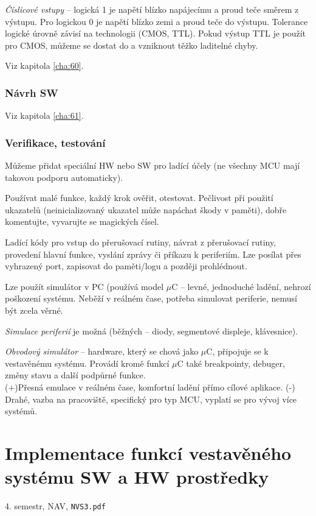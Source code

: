 \documentclass[a4paper, 11pt]{report}
\begin{document}
\emph{Číslicové vstupy} -- logická 1 je napětí blízko napájecímu a proud teče směrem z výstupu. Pro logickou 0 je napětí blízko zemi a proud teče do výstupu. Tolerance logické úrovně závisí na technologii (CMOS, TTL). Pokud výstup TTL je použít pro CMOS, můžeme se dostat do  a vzniknout těžko laditelné chyby.

Viz kapitola \ref{cha:60}.

\subsection{Návrh SW}
Viz kapitola \ref{cha:61}.

\subsection{Verifikace, testování}
Můžeme přidat speciální HW nebo SW pro ladící účely (ne všechny MCU mají takovou podporu automaticky).

Používat malé funkce, každý krok ověřit, otestovat. Pečlivost při použití ukazatelů (neinicializovaný ukazatel může  napáchat škody v paměti), dobře komentujte, vyvarujte se magických čísel.

Ladící kódy pro vstup do přerušovací rutiny, návrat z přerušovací rutiny, provedení hlavní funkce, vyslání zprávy či příkazu k periferiím. Lze posílat přes vyhrazený port, zapisovat do paměti/logu a později prohlédnout.

Lze použít simulátor v PC (používá model $\mu$C -- levné, jednoduché ladění, nehrozí poškození systému. Neběží v reálném čase, potřeba simulovat periferie, nemusí být zcela věrné.

\emph{Simulace periferií} je možná (běžných -- diody, segmentové displeje, klávesnice).

\emph{Obvodový simulátor} -- hardware, který se chová jako $\mu$C, připojuje se k vestavěnému systému. Provádí kromě funkcí $\mu$C také breakpointy, debuger, změny stavu a další podpůrné funkce.\\
(+)Přesná emulace v reálném čase, komfortní ladění přímo cílové aplikace. (-) Drahé, vazba na pracoviště, specifický pro typ MCU, vyplatí se pro vývoj více systémů.

\chapter{Implementace funkcí vestavěného systému SW a HW prostředky} \label{cha:59}
4. semestr, NAV, \texttt{NVS3.pdf}
\end{document}
